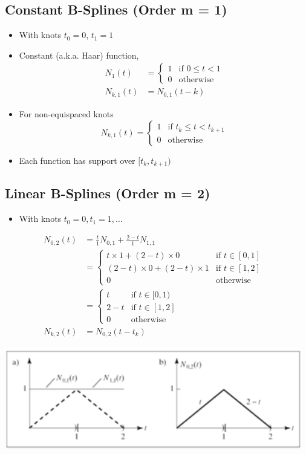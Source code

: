 \documentclass{article}
\begin{document}
\subsection*{Constant B-Splines (Order m = 1)}
\begin{itemize}
    \item With knots $t_0 = 0$, $t_1 = 1$
    \item Constant (a.k.a. Haar) function,
    \begin{align*}
        N_1(t) &= \begin{cases}1 & \text{if } 0 \leq t < 1 \\ 0 & \text{otherwise}\end{cases}\\
        N_{k, 1}(t) &= N_{0, 1}(t - k)
    \end{align*}
    \item For non-equispaced knots
    \[N_{k, 1}(t) = \begin{cases}1 & \text{if } t_k \leq t < t_{k + 1} \\ 0 & \text{otherwise}\end{cases}\]
    \item Each function has support over $[t_k, t_{k + 1})$
\end{itemize}

\subsection*{Linear B-Splines (Order m = 2)}
\begin{itemize}
    \item With knots $t_0 = 0, t_1 = 1, \dots$
\end{itemize}
\begin{align*}
    N_{0, 2}(t) &= \frac{t}{1} N_{0, 1} + \frac{2 - t}{1}N_{1, 1}\\
    &= \begin{cases}t \times 1 + (2 - t) \times 0 & \text{if } t \in [0, 1] \\ (2 - t) \times 0 + (2 - t) \times 1 & \text{if } t \in [1, 2] \\ 0 & \text{otherwise}\end{cases}\\
    &= \begin{cases} t & \text{if } t \in [0, 1) \\ 2 - t & \text{if } t \in [1, 2] \\ 0 & \text{otherwise}\end{cases}
    & \\
    N_{k, 2}(t) &= N_{0, 2}(t - t_k)
\end{align*}    
\begin{center}
    \includegraphics*[scale=0.8]{W3_15.png}
\end{center}
\end{document}

